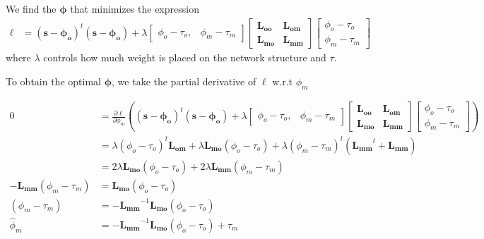        We find the $\mathbf{\phi}$ that minimizes the expression
        \begin{align}
            \ell &= (\mathbf{s} - \mathbf{\phi_o})^t(\mathbf{s} - \mathbf{\phi_o}) + \lambda
                \begin{bmatrix}
                    \phi_o - \tau_o, & \phi_m - \tau_m
                \end{bmatrix}
                \begin{bmatrix}
                    \mathbf{L_{oo}} & \mathbf{L_{om}} \\ \mathbf{L_{mo}} & \mathbf{L_{mm}}
                \end{bmatrix}
                \begin{bmatrix}
                    \phi_o - \tau_o \\ \phi_m - \tau_m
                \end{bmatrix} \label{eqn:laplacian_regularization_objective_function}
        \end{align}
        \noindent where $\lambda$ controls how much weight is
        placed on the network structure and $\tau$.

        To obtain the optimal $\mathbf{\phi}$, we take the partial
        derivative of $\ell$ w.r.t $\phi_m$

        \begin{align}
            0 &= \frac{\partial\ell}{\partial\phi_m}\left((\mathbf{s} - \mathbf{\phi_o})^t(\mathbf{s} - \mathbf{\phi_o}) + \lambda
                \begin{bmatrix}
                    \phi_o - \tau_o, & \phi_m - \tau_m
                \end{bmatrix}
                \begin{bmatrix}
                    \mathbf{L_{oo}} & \mathbf{L_{om}} \\ \mathbf{L_{mo}} & \mathbf{L_{mm}}
                \end{bmatrix}
                \begin{bmatrix}
                    \phi_o - \tau_o \\ \phi_m - \tau_m
                \end{bmatrix}\right)\\
            &= \lambda(\phi_o - \tau_o)^t\mathbf{L_{om}} + \lambda\mathbf{L_{mo}}(\phi_o - \tau_o)
                 + \lambda(\phi_m - \tau_m)^t(\mathbf{L_{mm}}^t+ \mathbf{L_{mm}}) \nonumber\\
            &= 2\lambda\mathbf{L_{mo}}(\phi_o - \tau_o) + 2\lambda\mathbf{L_{mm}}(
                \phi_m - \tau_m) \nonumber\\
            -\mathbf{L_{mm}}(\phi_m - \tau_m) &= \mathbf{L_{mo}}(\phi_o - \tau_o) \nonumber\\
            (\phi_m - \tau_m) &= -\mathbf{L_{mm}}^{-1}\mathbf{L_{mo}}(\phi_o - \tau_o) \nonumber\\
            {\hat \phi_m} &= -\mathbf{L_{mm}}^{-1}\mathbf{L_{mo}}(\phi_o - \tau_o) + \tau_m
            \label{eqn:estimate_of_phi_m}
        \end{align}

